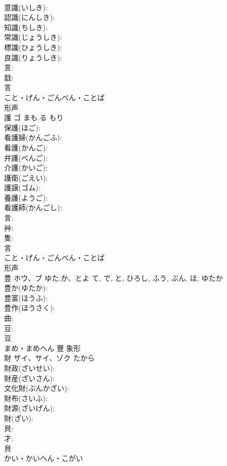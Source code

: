 \documentclass[8pt]{extreport}
\begin{document}
\begin{CJK}{UTF8}{min}
\\	意識(いしき): 
\\	認識(にんしき): 
\\	知識(ちしき): 
\\	常識(じょうしき): 
\\	標識(ひょうしき): 
\\	良識(りょうしき): 
\\	言: 
\\	戠: 
\\	言	
\\	こと・げん・ごんべん・ことば	
\\	形声 
\\	護	ゴ	まも.る	もり	
\\	保護(ほご): 
\\	看護婦(かんごふ): 
\\	看護(かんご): 
\\	弁護(べんご): 
\\	介護(かいご): 
\\	護衛(ごえい): 
\\	護謨(ゴム): 
\\	養護(ようご): 
\\	看護師(かんごし): 
\\	言: 
\\	艸: 
\\	隻: 
\\	言	
\\	こと・げん・ごんべん・ことば	
\\	形声 
\\	豊	ホウ、ブ	ゆた.か、とよ	て, で, と, ひろし, ふう, ぶん, ほ, ゆたか	
\\	豊か(ゆたか): 
\\	豊富(ほうふ): 
\\	豊作(ほうさく): 
\\	曲: 
\\	豆: 
\\	豆	
\\	まめ・まめへん	豐	象形 
\\	財	ザイ、サイ、ゾク	たから		
\\	財政(ざいせい): 
\\	財産(ざいさん): 
\\	文化財(ぶんかざい): 
\\	財布(さいふ): 
\\	財源(ざいげん): 
\\	財(ざい): 
\\	貝: 
\\	才: 
\\	貝	
\\	かい・かいへん・こがい	

\end{CJK}
\end{document}

